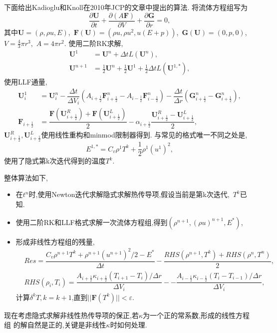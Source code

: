 \documentclass[a4paper, 11pt]{ctexart}
\numberwithin{equation}{section}
\numberwithin{figure}{section}
\newcommand\bF{\boldsymbol{F}}
\newcommand\bG{\boldsymbol{G}}
\newcommand\bU{\boldsymbol{U}}
\newcommand\pd[2]{\dfrac{\partial {#1}}{\partial {#2}}}
\newcommand\norm[1]{\lvert\lvert #1 \rvert\rvert}
\begin{document}
下面给出Kadioglu和Knoll在2010年JCP的文章中提出的算法.
将流体方程组写为
\begin{equation}
  \pd{\bU}{t}+\pd{(A\bF)}{V}+\pd{\bG}{r}=0,
\end{equation}
其中$\bU=(\rho,\rho u,E)$,~$\bF(\bU)=(\rho u,\rho
u^2,u(E+p))$,~$\bG(\bU)=(0,p,0)$,~$V=\frac43\pi r^3$,~$A=4\pi r^2$.
使用二阶RK求解,
\begin{align}
  \bU^1&=\bU^n+\Delta tL(\bU^n),\\
  \bU^{n+1}&=\frac12\bU^n+\frac12\bU^1+\frac12\Delta tL(\bU^{1,*}),
\end{align}
使用LLF通量,
\begin{align}
  \bU^1_i&=\bU^n_i-\dfrac{\Delta t}{\Delta V_i}(A_{i+\frac12}\bF^n_{i+\frac12}
  -A_{i-\frac12}\bF^n_{i-\frac12})-\dfrac{\Delta t}{\Delta
  r}(\bG^n_{i+\frac12}-\bG^n_{i+\frac12}),\\
  \bF_{i+\frac12}&=\dfrac{\bF(\bU^R_{i+\frac12})+\bF(\bU^L_{i+\frac12})}{2}
  -\alpha_{i+\frac12}\dfrac{\bU^R_{i+\frac12}-\bU^L_{i+\frac12}}{2},
\end{align}
$\bU^R_{i+\frac12}, \bU^L_{i+\frac12}$使用线性重构和minmod限制器得到.
与常见的格式唯一不同之处是,
\begin{equation}
  E^{1,*}=C_v\rho^1 T^k+\frac12\rho^1(u^1)^2,
\end{equation}
使用了隐式第k次迭代得到的温度$T^k$.


整体算法如下,
\begin{itemize}
  \item 在$t^n$时,使用Newton迭代求解隐式求解热传导项,假设当前是第k次迭代,~$T^k$已知.
  \item 使用二阶RK和LLF格式求解一次流体方程组,得到$(\rho^{n+1},(\rho u)^{n+1},E^*)$,
  \item 形成非线性方程组的残量,
    \begin{align}
      &Res=\dfrac{C_v\rho^{n+1}T^k+\rho^{n+1}(u^{n+1})^2/2-E^*}{\Delta
      t}-\dfrac{RHS(\rho^{n+1},T^k)+RHS(\rho^{n},T^n)}{2},\\
      &RHS(\rho_i,T_i)=\dfrac{A_{i+\frac12}\kappa_{i+\frac12}(T_{i+1}-T_i)/\Delta r}{\Delta V_i}-
      -\dfrac{A_{i-\frac12}\kappa_{i-\frac12}(T_{i}-T_{i-1})/\Delta r}{\Delta V_i},
    \end{align}
    计算$\delta^k T,k=k+1$,直到$\norm{\bF(T^k)}<\varepsilon$.
\end{itemize}

现在考虑隐式求解非线性热传导项的保正,若$\kappa$为一个正的常系数,形成的线性方程组
的解自然是正的,关键是非线性$\kappa$时如何处理.
\end{document}
